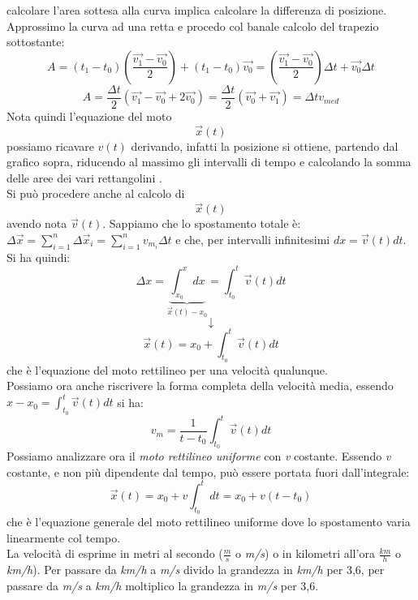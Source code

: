 \documentclass[a4paper,12pt, oneside]{book}
\begin{document}
calcolare l'area sottesa alla curva implica calcolare la differenza di posizione. Approssimo la curva ad una retta e procedo col banale calcolo del trapezio sottostante:
$$A=(t_1-t_0)(\frac{\vec{v_1}-\vec{v_0}}{2})+(t_1-t_0
)\vec{v_0}=(\frac{\vec{v_1}-\vec{v_0}}{2})\Delta t+\vec{v_0}\Delta t$$
$$A=\frac{\Delta t}{2}(\vec{v_1}-\vec{v_0}+2\vec{v_0})=\frac{\Delta t}{2}(\vec{v_0}+\vec{v_1})=\Delta t v_{med}$$
Nota quindi l'equazione del moto $$\vec{x}(t)$$ possiamo ricavare $v(t)$ derivando, infatti la posizione si ottiene, partendo dal grafico sopra, riducendo al massimo gli intervalli di tempo e calcolando la somma delle aree dei vari rettangolini .\\
Si può procedere anche al calcolo di $$\vec{x}(t)$$ avendo nota $\vec{v}(t)$. Sappiamo che lo spostamento totale è: $\Delta \vec{x}=\sum_{i=1}^n \Delta \vec{x}_i=\sum_{i=1}^n v_{m_i} \Delta t$ e che, per intervalli infinitesimi $dx=\vec{v}(t) dt$. Si ha quindi:
$$\Delta x=\underbrace{\int_{x_0}^x dx}_{\vec{x}(t)-x_0}=\int_{t_0}^t \vec{v}(t) dt$$
$$\downarrow$$
$$\vec{x}(t)=x_0+\int_{t_0}^t \vec{v}(t) dt$$
che è l'equazione del moto rettilineo per una velocità qualunque.\\
Possiamo ora anche riscrivere la forma completa della velocità media, essendo $x-x_0=\int_{t_0}^t \vec{v}(t) dt$ si ha:
$$v_m=\frac{1}{t-t_0}\int_{t_0}^t \vec{v}(t) dt$$
Possiamo analizzare ora il \textit{moto rettilineo uniforme} con \textit{v} costante. Essendo \textit{v} costante, e non più dipendente dal tempo, può essere portata fuori dall'integrale:
$$\vec{x}(t)=x_0+v\int_{t_0}^t dt=x_0+v(t-t_0)$$
che è l'equazione generale del moto rettilineo uniforme dove lo spostamento varia linearmente col tempo.\\
La velocità di esprime in metri al secondo ($\frac{m}{s}$ o \textit{m/s}) o in kilometri all'ora $\frac{km}{h}$ o \textit{km/h}). Per passare da \textit{km/h} a \textit{m/s} divido la grandezza in \textit{km/h} per 3,6, per passare da \textit{m/s} a \textit{km/h} moltiplico la grandezza in \textit{m/s} per 3,6. 
\end{document}
